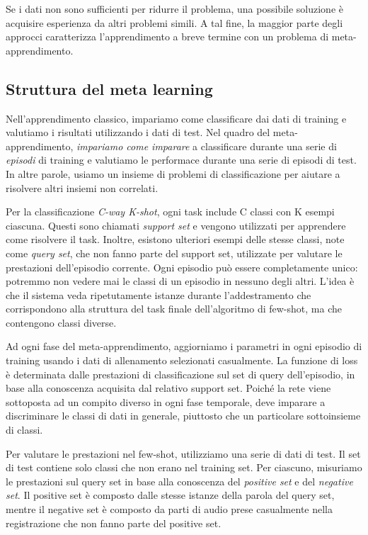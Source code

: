 \documentclass[12pt,a4paper,titlepage]{article}
\begin{document}
Se i dati non sono sufficienti per ridurre il problema, una possibile soluzione è acquisire esperienza da altri problemi simili. A tal fine, la maggior parte degli approcci caratterizza l'apprendimento a breve termine con un problema di meta-apprendimento.

\subsection{Struttura del meta learning}
Nell'apprendimento classico, impariamo come classificare dai dati di training e valutiamo i risultati utilizzando i dati di test. Nel quadro del meta-apprendimento, \textit{impariamo come imparare} a classificare durante una serie di \textit{episodi} di training e valutiamo le performace durante una serie di episodi di test. In altre parole, usiamo un insieme di problemi di classificazione per aiutare a risolvere altri insiemi non correlati.

Per la classificazione \textit{C-way K-shot}, ogni task include C classi con K esempi ciascuna. Questi sono chiamati \textit{support set} e vengono utilizzati per apprendere come risolvere il task. Inoltre, esistono ulteriori esempi delle stesse classi, note come \textit{query set}, che non fanno parte del support set, utilizzate per valutare le prestazioni dell'episodio corrente. Ogni episodio può essere completamente unico: potremmo non vedere mai le classi di un episodio in nessuno degli altri. L'idea è che il sistema veda ripetutamente istanze durante l'addestramento che corrispondono alla struttura del task finale dell'algoritmo di few-shot, ma che contengono classi diverse.

Ad ogni fase del meta-apprendimento, aggiorniamo i parametri in ogni episodio di training usando i dati di allenamento selezionati casualmente. La funzione di loss è determinata dalle prestazioni di classificazione sul set di query dell'episodio, in base alla conoscenza acquisita dal relativo support set. Poiché la rete viene sottoposta ad un compito diverso in ogni fase temporale, deve imparare a discriminare le classi di dati in generale, piuttosto che un particolare sottoinsieme di classi.

Per valutare le prestazioni nel few-shot, utilizziamo una serie di dati di test. Il set di test contiene solo classi  che non erano nel training set. Per ciascuno, misuriamo le prestazioni sul query set in base alla conoscenza del \textit{positive set} e del \textit{negative set}. Il positive set è composto dalle stesse istanze della parola del query set, mentre il negative set è composto da parti di audio prese casualmente nella registrazione che non fanno parte del positive set.
\clearpage
\end{document}
